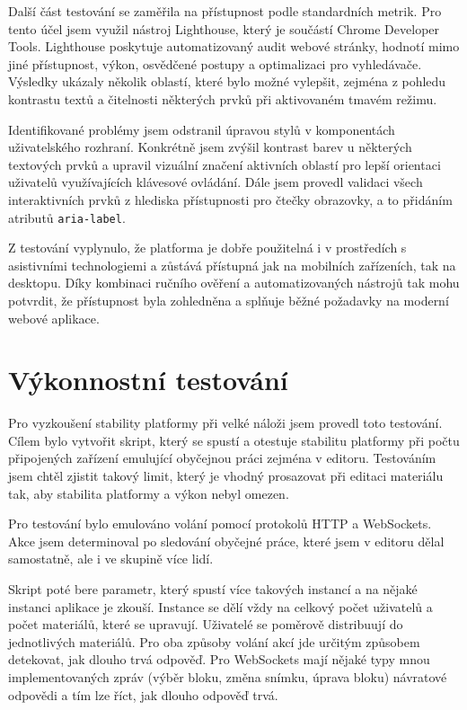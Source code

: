 Další část testování se zaměřila na přístupnost podle standardních metrik. 
Pro tento účel jsem využil nástroj Lighthouse, který je součástí Chrome Developer Tools. 
Lighthouse poskytuje automatizovaný audit webové stránky, hodnotí mimo jiné přístupnost, výkon, osvědčené postupy a optimalizaci pro vyhledávače. 
Výsledky ukázaly několik oblastí, které bylo možné vylepšit, zejména z pohledu kontrastu textů a čitelnosti některých prvků při aktivovaném tmavém režimu.

Identifikované problémy jsem odstranil úpravou stylů v komponentách uživatelského rozhraní. 
Konkrétně jsem zvýšil kontrast barev u některých textových prvků a upravil vizuální značení aktivních oblastí pro lepší orientaci uživatelů využívajících klávesové ovládání.
Dále jsem provedl validaci všech interaktivních prvků z hlediska přístupnosti pro čtečky obrazovky, a to přidáním atributů \texttt{aria-label}.

Z testování vyplynulo, že platforma je dobře použitelná i v prostředích s asistivními technologiemi a zůstává přístupná jak na mobilních zařízeních, tak na desktopu.
Díky kombinaci ručního ověření a automatizovaných nástrojů tak mohu potvrdit, že přístupnost byla zohledněna a splňuje běžné požadavky na moderní webové aplikace.

\section{Výkonnostní testování}\label{text:testovani/vykon}

Pro vyzkoušení stability platformy při velké náloži jsem provedl toto testování.
Cílem bylo vytvořit skript, který se spustí a otestuje stabilitu platformy při počtu připojených zařízení emulující obyčejnou práci zejména v editoru.
Testováním jsem chtěl zjistit takový limit, který je vhodný prosazovat při editaci materiálu tak, aby stabilita platformy a výkon nebyl omezen.

Pro testování bylo emulováno volání pomocí protokolů HTTP a WebSockets.
Akce jsem determinoval po sledování obyčejné práce, které jsem v editoru dělal samostatně, ale i ve skupině více lidí.

Skript poté bere parametr, který spustí více takových instancí a na nějaké instanci aplikace je zkouší.
Instance se dělí vždy na celkový počet uživatelů a počet materiálů, které se upravují.
Uživatelé se poměrově distribuují do jednotlivých materiálů.
Pro oba způsoby volání akcí jde určitým způsobem detekovat, jak dlouho trvá odpověď.
Pro WebSockets mají nějaké typy mnou implementovaných zpráv (výběr bloku, změna snímku, úprava bloku) návratové odpovědi a tím lze říct, jak dlouho odpověď trvá.

